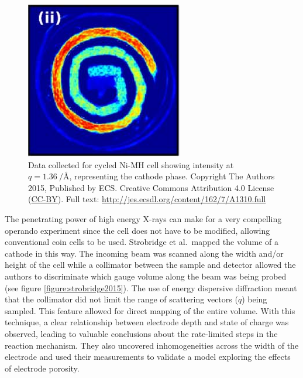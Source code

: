\documentclass[journal=cmatex,manuscript=perspective]{achemso}
\begin{document}
\begin{figure}
  \includegraphics[width=\textwidth]{jensen2015.png}
  \caption{Data collected for cycled Ni-MH cell showing intensity at
    $q = \SI{1.36}{\per\angstrom}$, representing the cathode
    phase.\cite{jensen2015} Copyright The Authors 2015, Published by
    ECS. Creative Commons Attribution 4.0 License
    (\href{http://creativecommons.org/licenses/by/4.0/}{CC-BY}). Full
    text: \url{http://jes.ecsdl.org/content/162/7/A1310.full}}
  \label{figure:jensen2015}
\end{figure}

The penetrating power of high energy X-rays can make for a very
compelling operando experiment since the cell does not have to be
modified, allowing conventional coin cells to be used. Strobridge et
al.\ mapped the volume of a  cathode in this
way\cite{strobridge2015}. The incoming beam was scanned along the
width and/or height of the cell while a collimator between the sample
and detector allowed the authors to discriminate which gauge volume
along the beam was being probed (see figure
\ref{figure:strobridge2015}). The use of energy dispersive diffraction
meant that the collimator did not limit the range of scattering
vectors ($q$) being sampled. This feature allowed for direct mapping
of the entire volume. With this technique, a clear relationship
between electrode depth and state of charge was observed, leading to
valuable conclusions about the rate-limited steps in the reaction
mechanism. They also uncovered inhomogeneities across the width of the
electrode and used their measurements to validate a model exploring
the effects of electrode porosity.
\end{document}
